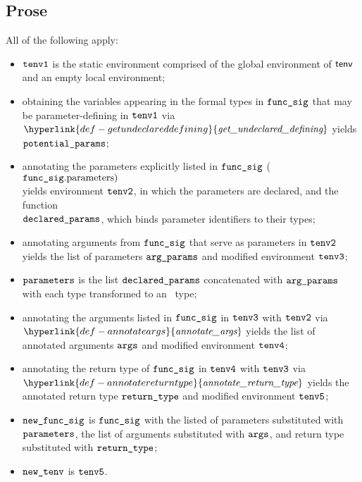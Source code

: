 \documentclass{book}
\newcommand\ProseOrTypeError[0]{\ProseTerminateAs{\TypeErrorConfig}}
\newcommand\annotateargs[0]{\hyperlink{def-annotateargs}{\textfunc{annotate\_args}}}
\newcommand\annotatereturntype[0]{\hyperlink{def-annotatereturntype}{\textfunc{annotate\_return\_type}}}
\newcommand\getundeclareddefining[0]{\hyperlink{def-getundeclareddefining}{\textfunc{get\_undeclared\_defining}}}
\begin{document}
\subsection{Prose}
All of the following apply:
\begin{itemize}
  \item $\texttt{tenv1}$ is the static environment comprised of the global environment of $\textsf{tenv}$ and an empty local environment;
  \item obtaining the variables appearing in the formal types in $\texttt{func\_sig}$ that may be parameter-defining
        in $\texttt{tenv1}$ via $\getundeclareddefining$ yields \\ $\texttt{potential\_params}$;
  \item annotating the parameters explicitly listed in $\texttt{func\_sig}$ ($\texttt{func\_sig}.\text{parameters})$ \\
        yields environment $\texttt{tenv2}$, in which the parameters are declared,
        and the function \\
        $\texttt{declared\_params}$, which binds parameter identifiers to their types\ProseOrTypeError;
  \item annotating arguments from $\texttt{func\_sig}$ that serve as parameters in $\texttt{tenv2}$ yields the list of parameters
        $\texttt{arg\_params}$ and modified environment $\texttt{tenv3}$\ProseOrTypeError;
  \item $\texttt{parameters}$ is the list $\texttt{declared\_params}$ concatenated with $\texttt{arg\_params}$ with each type
        transformed to an \optional\ type;
  \item annotating the arguments listed in $\texttt{func\_sig}$ in $\texttt{tenv3}$ with $\texttt{tenv2}$ via \\
        $\annotateargs$ yields the list of annotated
        arguments $\texttt{args}$ and modified environment $\texttt{tenv4}$\ProseOrTypeError;
  \item annotating the return type of $\texttt{func\_sig}$ in $\texttt{tenv4}$ with $\texttt{tenv3}$ via \\ $\annotatereturntype$ yields
        the annotated return type $\texttt{return\_type}$ and modified environment $\texttt{tenv5}$\ProseOrTypeError;
  \item $\texttt{new\_func\_sig}$ is $\texttt{func\_sig}$ with the listed of parameters substituted with \\ $\texttt{parameters}$,
        the list of arguments substituted with $\texttt{args}$, and return type substituted with $\texttt{return\_type}$;
  \item $\texttt{new\_tenv}$ is $\texttt{tenv5}$.
\end{itemize}
\end{document}
